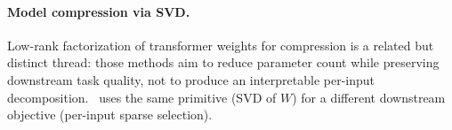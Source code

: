 \paragraph{Model compression via SVD.} Low-rank factorization of transformer weights for compression \citep{hsu2022svd, kaushal2023lord} is a related but distinct thread: those methods aim to reduce parameter count while preserving downstream task quality, not to produce an interpretable per-input decomposition. \svdomp\ uses the same primitive (SVD of $W$) for a different downstream objective (per-input sparse selection).
